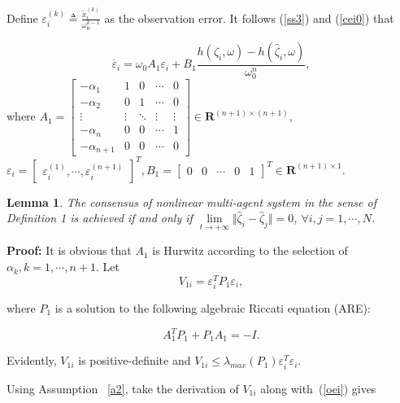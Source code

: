 \documentclass[english]{cccconf}
\newtheorem{lemma}{Lemma}
\begin{document}
Define $\varepsilon_i^{(k)} \triangleq \frac{\tilde x_i^{(k)}}{\omega_0^{k-1}} $ as the observation error. It follows (\ref{ss3}) and (\ref{cei0}) that

\begin{equation}
  \label{oei}
  \dot {\varepsilon_i} =\omega_0 A_1 \varepsilon_i + B_1 \frac{h(\zeta_i,\omega)-h(\hat \zeta_i,\omega)}{\omega_0^n},
\end{equation} where $A_{1}=\begin{bmatrix} -\alpha_1 & 1 & 0 & \cdots & 0\\ -\alpha_2 & 0 & 1 & \cdots & 0\\ \vdots & \vdots & \ddots & \vdots & \vdots \\ -\alpha_n & 0 & 0 & \cdots & 1\\ -\alpha_{n+1} & 0 & 0 & \cdots & 0 \end{bmatrix} \in \mathbf R^{(n+1) \times (n+1)}$, $\varepsilon_i = \begin{bmatrix} \varepsilon_i^{(1)}, \cdots, \varepsilon_i^{(n+1)} \end{bmatrix}^T, B_{1}=\begin{bmatrix} 0 & 0 & \cdots & 0 & 1\end{bmatrix} ^T \in \mathbf R^{(n+1) \times 1}$.

\begin{lemma}\label{OberverErrors}
The consensus of nonlinear multi-agent system in the sense of Definition 1 is achieved if and only if $\mathop{lim}\limits_{t \to +\infty} \Vert \hat \zeta_i - \hat \zeta_j \Vert = 0$, $\forall i, j=1,\cdots, N$.
\end{lemma}

\textbf{Proof:} It is obvious that $A_1$ is Hurwitz according to the selection of $\alpha_k, k=1,\cdots, n+1$. 
Let \begin{equation} 
\label{V1i}
V_{1i}=\varepsilon^T_i P_1 \varepsilon_i, 
 \end{equation}
 
 where $P_1$ is a solution to the following algebraic Riccati equation (ARE):
 
 \begin{equation}
\label{t1}
A_1^T P_1 + P_1 A_1 = -I.  
\end{equation}

Evidently, $V_{1i}$ is positive-definite and $V_{1i} \le \lambda_{max}(P_1) \varepsilon^T_i \varepsilon_i$.

 
Using Assumption ~\ref{a2}, take the derivation of $V_{1i}$ along with~(\ref{oei}) gives
\end{document}
